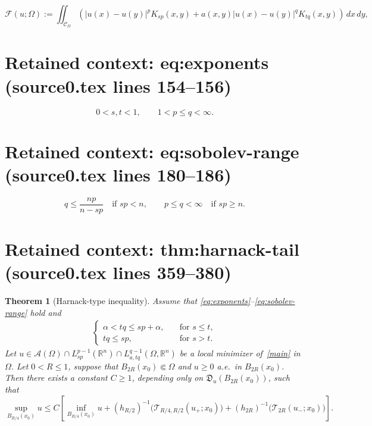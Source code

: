 \documentclass[10pt,a4paper]{amsart}
\newcommand{\R}{\mathbb R}
\newcommand{\calC}{\mathcal C}
\newcommand{\calF}{\mathcal F}
\newcommand{\calT}{\mathcal T}
\newcommand{\dd}{\,d}
\theoremstyle{plain}
\newtheorem{theorem}{Theorem}[section]
\theoremstyle{definition}
\theoremstyle{remark}
\begin{document}
\begin{equation}\label{main}
    \calF(u;\Omega)
    :=\iint_{\calC_\Omega}\left(|u(x)-u(y)|^p K_{sp}(x,y)+ a(x,y)|u(x)-u(y)|^q K_{tq}(x,y)
    \right)\dd x\!\dd y ,
\end{equation}


\section*{Retained context: eq:exponents (source0.tex lines 154--156)}

\begin{equation}\label{eq:exponents}
    0<s,t<1,\qquad 1<p\le q<\infty.
\end{equation}


\section*{Retained context: eq:sobolev-range (source0.tex lines 180--186)}

\begin{equation}\label{eq:sobolev-range}
    q\le\frac{np}{n-sp}
    \quad\text{if }sp<n,
    \qquad
    p\le q<\infty
    \quad\text{if }sp\ge n.
\end{equation}


\section*{Retained context: thm:harnack-tail (source0.tex lines 359--380)}

\begin{theorem}[Harnack-type inequality]
\label{thm:harnack-tail}
Assume that \eqref{eq:exponents}--\eqref{eq:sobolev-range} hold and
\begin{align*}
\begin{cases}
\alpha<tq \leq sp+\alpha,  \quad &\text{for  } s\le t,\\[2mm]
tq\le sp,        \quad&\text{for  } s>t.
\end{cases}
\end{align*}
Let \(u\in\mathcal{A}(\Omega)\cap L^{p-1}_{sp}(\R^n)
\cap L^{q-1}_{a,tq}(\Omega,\R^n)\) be a local minimizer
of~\eqref{main} in \(\Omega\). Let \(0<R\le1\), suppose that
\(B_{2R}(x_0)\Subset\Omega\) and \(u\ge0\) a.e.\ in
\(B_{2R}(x_0)\).
Then there exists a constant \(C\ge1\), depending only on
\(\mathfrak D_u(B_{2R}(x_0))\), such that
\begin{equation}\label{eq:harnack-tail}
    \sup_{B_{R/4}(x_0)}u
    \le
    C\left[\inf_{B_{R/4}(x_0)}u+(h_{R/2})^{-1}\bigl(\calT_{R/4,R/2}(u_+;x_0)\bigr)+(h_{2R})^{-1}\bigl(\calT_{2R}(u_-;x_0)\bigr)\right].
\end{equation}
\end{theorem}
\end{document}
